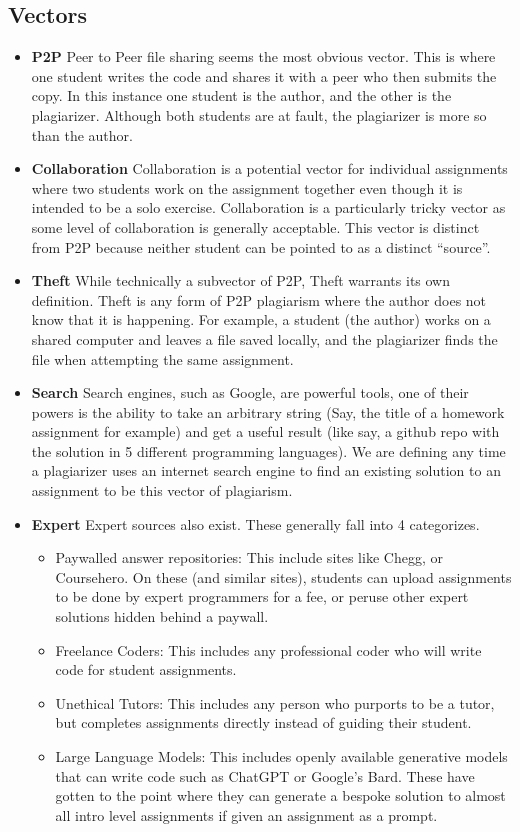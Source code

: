 \documentclass[letterpaper,10pt,conference]{IEEEtran}
\begin{document}
\subsection{Vectors}
\begin{itemize}
\item \textbf{P2P} Peer to Peer file sharing seems the most obvious vector.  This is where one student writes the code and shares it with a peer who then submits the copy.  In this instance one student is the author, and the other is the plagiarizer.  Although both students are at fault, the plagiarizer is more so than the author.  
	
	\item \textbf{Collaboration} Collaboration is a potential vector for individual assignments where two students work on the assignment together even though it is intended to be a solo exercise.  Collaboration is a particularly tricky vector as some level of collaboration is generally acceptable.  This vector is distinct from P2P because neither student can be pointed to as a distinct ``source''.
	
	\item \textbf{Theft}  While technically a subvector of P2P, Theft warrants its own definition.  Theft is any form of P2P plagiarism where the author does not know that it is happening.  For example, a student (the author) works on a shared computer and leaves a file saved locally, and the plagiarizer finds the file when attempting the same assignment.  
	
	\item \textbf{Search}  Search engines, such as Google, are powerful tools, one of their powers is the ability to take an arbitrary string (Say, the title of a homework assignment for example) and get a useful result (like say, a github repo with the solution in 5 different programming languages).  We are defining any time a plagiarizer uses an internet search engine to find an existing solution to an assignment to be this vector of plagiarism.
	
	\item \textbf{Expert} Expert sources also exist.  These generally fall into 4 categorizes.
	\begin{itemize}
	\item Paywalled answer repositories:  This include sites like Chegg, or Coursehero.  On these (and similar sites), students can upload assignments to be done by expert programmers for a fee, or peruse other expert solutions hidden behind a paywall.  
	\item Freelance Coders: This includes any professional coder who will write code for student assignments.
	\item Unethical Tutors: This includes any person who purports to be a tutor, but completes assignments directly instead of guiding their student.
	\item Large Language Models:  This includes openly available generative models that can write code such as ChatGPT or Google's Bard.  These have gotten to the point where they can generate a bespoke solution to almost all intro level assignments if given an assignment as a prompt.
	

\end{itemize}
\end{itemize}
\end{document}
